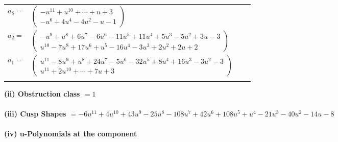 \documentclass[1p]{elsarticle_modified}
\theoremstyle{definition}
\begin{document}
\begin{tabular}{m{7pt} m{180pt} m{7pt} m{180pt} }
\flushright $a_{8}=$&$\begin{pmatrix}- u^{11}+u^{10}+\cdots+u+3\\- u^6+4 u^4-4 u^2- u-1\end{pmatrix}$ \\
\flushright $a_{2}=$&$\begin{pmatrix}- u^9+u^8+6 u^7-6 u^6-11 u^5+11 u^4+5 u^3-5 u^2+3 u-3\\u^{10}-7 u^8+17 u^6+u^5-16 u^4-3 u^3+2 u^2+2 u+2\end{pmatrix}$ \\
\flushright $a_{1}=$&$\begin{pmatrix}u^{11}-8 u^9+u^8+24 u^7-5 u^6-32 u^5+8 u^4+16 u^3-3 u^2-3\\u^{11}+2 u^{10}+\cdots+7 u+3\end{pmatrix}$\\&\end{tabular}
\flushleft \textbf{(ii) Obstruction class $= 1$}\\~\\
\flushleft \textbf{(iii) Cusp Shapes $= -6 u^{11}+4 u^{10}+43 u^9-25 u^8-108 u^7+42 u^6+108 u^5+u^4-21 u^3-40 u^2-14 u-8$}\\~\\
\newpage\renewcommand{\arraystretch}{1}
\flushleft \textbf{(iv) u-Polynomials at the component}\newline \\
\end{document}
